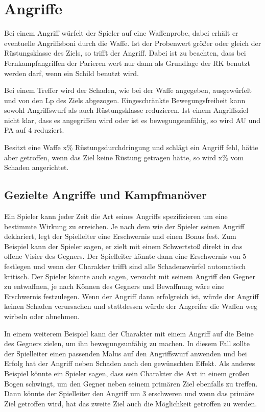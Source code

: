 \documentclass[../../Heldenanleitung2]{subfiles}
\begin{document}
\section{Angriffe}
Bei einem Angriff würfelt der Spieler auf eine Waffenprobe, dabei erhält er eventuelle Angriffsboni durch die Waffe. Ist der Probenwert größer oder gleich der Rüstungsklasse des Ziels, so trifft der Angriff. Dabei ist zu beachten, dass bei Fernkampfangriffen der Parieren wert nur dann als Grundlage der RK benutzt werden darf, wenn ein Schild benutzt wird.

Bei einem Treffer wird der Schaden, wie bei der Waffe angegeben, ausgewürfelt und von den Lp des Ziels abgezogen. Eingeschränkte Bewegungsfreiheit kann sowohl Angriffswurf als auch Rüstungsklasse reduzieren. Ist einem Angriffsziel nicht klar, dass es angegriffen wird oder ist es bewegungsunfähig, so wird AU und PA auf 4 reduziert.

Besitzt eine Waffe x\% Rüstungsdurchdringung und schlägt ein Angriff fehl, hätte aber getroffen, wenn das Ziel keine Rüstung getragen hätte, so wird x\% vom Schaden angerichtet.

\subsection{Gezielte Angriffe und Kampfmanöver}
Ein Spieler kann jeder Zeit die Art seines Angriffs spezifizieren um eine bestimmte Wirkung zu erreichen. Je nach dem wie der Spieler seinen Angriff deklariert, legt der Spielleiter eine Erschwernis und einen Bonus fest. Zum Beispiel kann der Spieler sagen, er zielt mit einem Schwertstoß direkt in das offene Visier des Gegners. Der Spielleiter könnte dann eine Erschwernis von 5 festlegen und wenn der Charakter trifft sind alle Schadenswürfel automatisch kritisch. Der Spieler könnte auch sagen, versucht mit seinem Angriff den Gegner zu entwaffnen, je nach Können des Gegners und Bewaffnung wäre eine Erschwernis festzulegen. Wenn der Angriff dann erfolgreich ist, würde der Angriff keinen Schaden verursachen und stattdessen würde der Angreifer die Waffen weg wirbeln oder abnehmen.

In einem weiterem Beispiel kann der Charakter mit einem Angriff auf die Beine des Gegners zielen, um ihn bewegungsunfähig zu machen. In diesem Fall sollte der Spielleiter einen passenden Malus auf den Angriffswurf anwenden und bei Erfolg hat der Angriff neben Schaden auch den gewünschten Effekt. Als anderes Beispiel könnte ein Spieler sagen, dass sein Charakter die Axt in einem großen Bogen schwingt, um den Gegner neben seinem primären Ziel ebenfalls zu treffen. Dann könnte der Spielleiter den Angriff um 3 erschweren und wenn das primäre Ziel getroffen wird, hat das zweite Ziel auch die Möglichkeit getroffen zu werden.
\end{document}
